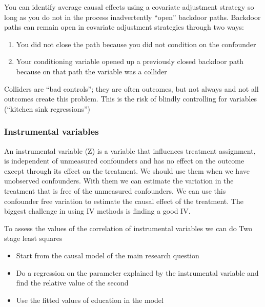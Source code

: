 \vspace{10pt}

You can identify average causal effects using a covariate adjustment strategy so long as you do not in the process inadvertently “open” backdoor paths. Backdoor paths can remain open in covariate adjustment strategies through two ways:

\begin{enumerate}
    \item  You did not close the path because you did not condition on the confounder
    \item Your conditioning variable opened up a previously closed backdoor path because on that path the variable was a collider
\end{enumerate}

Colliders are “bad controls”; they are often outcomes, but not always and not all outcomes create this problem. This is the risk of blindly controlling for variables (“kitchen sink regressions”)

\subsubsection{Instrumental variables}

An instrumental variable (Z) is a variable that influences treatment assignment, is independent of unmeasured confounders and has no effect on the outcome except through its effect on the treatment. We should use them when we have unobserved confounders. With them we can estimate the variation in the treatment that is free of the unmeasured confounders. We can use this confounder free variation to estimate the causal effect of the treatment. The biggest challenge in using IV methods is finding a good IV.

\vspace{10pt}

To assess the values of the correlation of instrumental variables we can do Two stage least squares

\begin{itemize}
    \item Start from the causal model of the main research question
    \item Do a regression on the parameter explained by the instrumental variable and find the relative value of the second
    \item Use the fitted values of education in the model
\end{itemize}

